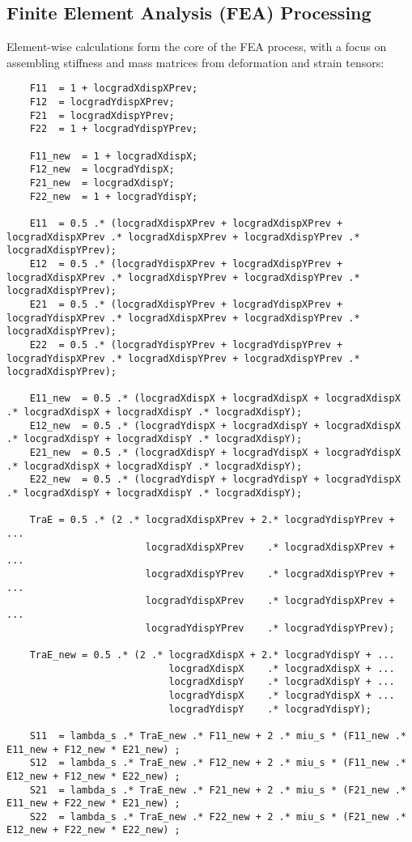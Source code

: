 \documentclass[a4paper,12pt]{article} %
\begin{document}
\subsection*{Finite Element Analysis (FEA) Processing}
Element-wise calculations form the core of the FEA process, with a focus on assembling stiffness and mass matrices from deformation and strain tensors:
\begin{verbatim}
    F11  = 1 + locgradXdispXPrev;
    F12  = locgradYdispXPrev;
    F21  = locgradXdispYPrev;
    F22  = 1 + locgradYdispYPrev;

    F11_new  = 1 + locgradXdispX;
    F12_new  = locgradYdispX;
    F21_new  = locgradXdispY;
    F22_new  = 1 + locgradYdispY;

    E11  = 0.5 .* (locgradXdispXPrev + locgradXdispXPrev + locgradXdispXPrev .* locgradXdispXPrev + locgradXdispYPrev .* locgradXdispYPrev);
    E12  = 0.5 .* (locgradYdispXPrev + locgradXdispYPrev + locgradXdispXPrev .* locgradXdispYPrev + locgradXdispYPrev .* locgradXdispYPrev);
    E21  = 0.5 .* (locgradXdispYPrev + locgradYdispXPrev + locgradYdispXPrev .* locgradXdispXPrev + locgradXdispYPrev .* locgradXdispYPrev);
    E22  = 0.5 .* (locgradYdispYPrev + locgradYdispYPrev + locgradYdispXPrev .* locgradXdispYPrev + locgradXdispYPrev .* locgradXdispYPrev);

    E11_new  = 0.5 .* (locgradXdispX + locgradXdispX + locgradXdispX .* locgradXdispX + locgradXdispY .* locgradXdispY);
    E12_new  = 0.5 .* (locgradYdispX + locgradXdispY + locgradXdispX .* locgradXdispY + locgradXdispY .* locgradXdispY);
    E21_new  = 0.5 .* (locgradXdispY + locgradYdispX + locgradYdispX .* locgradXdispX + locgradXdispY .* locgradXdispY);
    E22_new  = 0.5 .* (locgradYdispY + locgradYdispY + locgradYdispX .* locgradXdispY + locgradXdispY .* locgradXdispY);

    TraE = 0.5 .* (2 .* locgradXdispXPrev + 2.* locgradYdispYPrev + ...
                        locgradXdispXPrev    .* locgradXdispXPrev + ...
                        locgradXdispYPrev    .* locgradXdispYPrev + ...
                        locgradYdispXPrev    .* locgradYdispXPrev + ...
                        locgradYdispYPrev    .* locgradYdispYPrev);

    TraE_new = 0.5 .* (2 .* locgradXdispX + 2.* locgradYdispY + ...
                            locgradXdispX    .* locgradXdispX + ...
                            locgradXdispY    .* locgradXdispY + ...
                            locgradYdispX    .* locgradYdispX + ...
                            locgradYdispY    .* locgradYdispY);

    S11  = lambda_s .* TraE_new .* F11_new + 2 .* miu_s * (F11_new .* E11_new + F12_new * E21_new) ;
    S12  = lambda_s .* TraE_new .* F12_new + 2 .* miu_s * (F11_new .* E12_new + F12_new * E22_new) ;
    S21  = lambda_s .* TraE_new .* F21_new + 2 .* miu_s * (F21_new .* E11_new + F22_new * E21_new) ;
    S22  = lambda_s .* TraE_new .* F22_new + 2 .* miu_s * (F21_new .* E12_new + F22_new * E22_new) ;
\end{verbatim}
\end{document}
